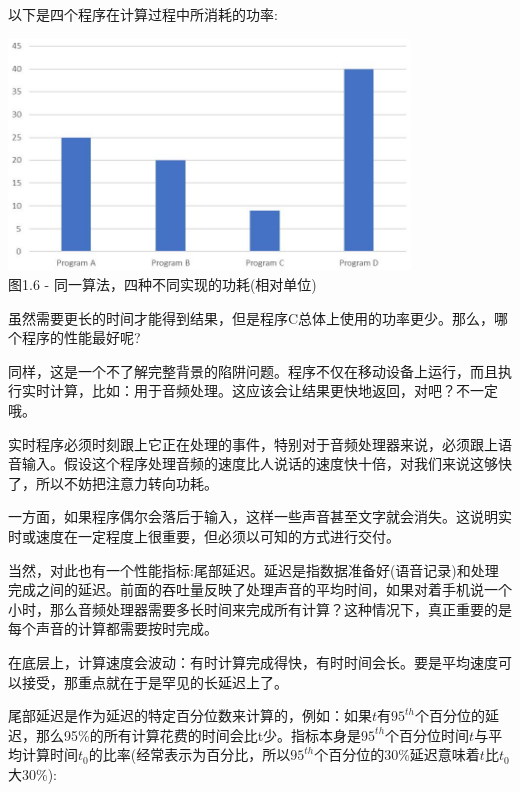 
以下是四个程序在计算过程中所消耗的功率:

\begin{center}
\includegraphics[width=0.8\textwidth]{content/1/chapter1/images/6.jpg}\\
图1.6 - 同一算法，四种不同实现的功耗(相对单位)
\end{center}

虽然需要更长的时间才能得到结果，但是程序C总体上使用的功率更少。那么，哪个程序的性能最好呢?

同样，这是一个不了解完整背景的陷阱问题。程序不仅在移动设备上运行，而且执行实时计算，比如：用于音频处理。这应该会让结果更快地返回，对吧？不一定哦。


实时程序必须时刻跟上它正在处理的事件，特别对于音频处理器来说，必须跟上语音输入。假设这个程序处理音频的速度比人说话的速度快十倍，对我们来说这够快了，所以不妨把注意力转向功耗。

一方面，如果程序偶尔会落后于输入，这样一些声音甚至文字就会消失。这说明实时或速度在一定程度上很重要，但必须以可知的方式进行交付。

当然，对此也有一个性能指标:尾部延迟。延迟是指数据准备好(语音记录)和处理完成之间的延迟。前面的吞吐量反映了处理声音的平均时间，如果对着手机说一个小时，那么音频处理器需要多长时间来完成所有计算？这种情况下，真正重要的是每个声音的计算都需要按时完成。

在底层上，计算速度会波动：有时计算完成得快，有时时间会长。要是平均速度可以接受，那重点就在于是罕见的长延迟上了。

尾部延迟是作为延迟的特定百分位数来计算的，例如：如果$ t $有$95^{th}$个百分位的延迟，那么95\%的所有计算花费的时间会比t少。指标本身是$95^{th}$个百分位时间$ t $与平均计算时间$ t_0 $的比率(经常表示为百分比，所以$95^{th}$个百分位的30\%延迟意味着$ t $比$ t_0 $大30\%):

